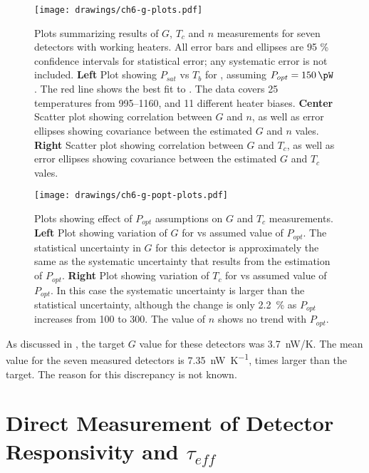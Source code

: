 \begin{figure*}
\texttt{[image: drawings/ch6-g-plots.pdf]}
\caption[$G$, $T_c$, and $n$ measurements]{
Plots summarizing results of $G$, $T_c$ and $n$ measurements for seven detectors with working heaters.
All error bars and ellipses are 95 \% confidence intervals for statistical error; any systematic error is not included.
\textbf{Left} Plot showing $P_{sat}$ vs $T_b$ for , assuming $P_{opt} = \SI{150}{\pW}$.
The red line shows the best fit to .
The data covers 25 temperatures from \SIrange{995}{1160}{\mK}, and 11 different heater biases.
\textbf{Center} Scatter plot showing correlation between $G$ and $n$, as well as error ellipses showing covariance between the estimated $G$ and $n$ vales.
\textbf{Right} Scatter plot showing correlation between $G$ and $T_c$, as well as error ellipses showing covariance between the estimated $G$ and $T_c$ vales.
} 
\label{fig:heater-g-plots}
\end{figure*}

\begin{figure*}
\texttt{[image: drawings/ch6-g-popt-plots.pdf]}
\caption[Impact of different $P_{opt}$ assumptions]{
Plots showing effect of $P_{opt}$ assumptions on $G$ and $T_c$ measurements.
\textbf{Left} Plot showing variation of $G$ for  vs assumed value of $P_{opt}$.
The statistical uncertainty in $G$ for this detector is approximately the same as the systematic uncertainty that results from the estimation of $P_{opt}$.
\textbf{Right} Plot showing variation of $T_c$ for  vs assumed value of $P_{opt}$.
In this case the systematic uncertainty is larger than the statistical uncertainty, although the change is only \SI{2.2}{\percent} as $P_{opt}$ increases from \SI{100}{\pW} to \SI{300}{\pW}.
The value of $n$ shows no trend with $P_{opt}$.
} 
\label{fig:heater-g-popt-plots}
\end{figure*}

As discussed in , the target $G$ value for these detectors was 3.7~nW/K.
The mean value for the seven measured detectors is \SI{7.35}{\nano\watt\per\kelvin},  times larger than the target.
The reason for this discrepancy is not known.

\section{Direct Measurement of Detector Responsivity and $\tau_{eff}$} \label{sec:teff-resp}


